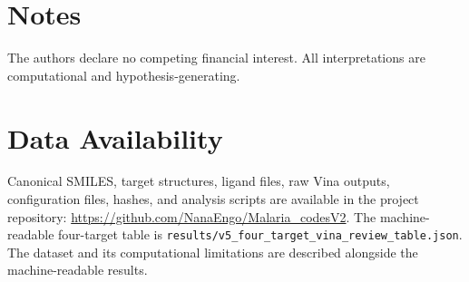 \documentclass[journal=jcisd8,manuscript=article]{achemso}
\begin{document}
\section*{Notes}
The authors declare no competing financial interest. All interpretations are computational and hypothesis-generating.

\section*{Data Availability}
Canonical SMILES, target structures, ligand files, raw Vina outputs, configuration files, hashes, and analysis scripts are available in the project repository: \url{https://github.com/NanaEngo/Malaria_codesV2}. The machine-readable four-target table is \texttt{results/v5\_four\_target\_vina\_review\_table.json}. The dataset and its computational limitations are described alongside the machine-readable results.


\end{document}
